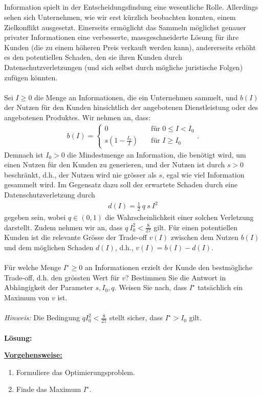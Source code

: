 \subsection*{}
Information spielt in der Entscheidungsfindung eine wesentliche Rolle. Allerdings
sehen sich Unternehmen, wie wir erst kürzlich beobachten konnten, einem Zielkonflikt
ausgesetzt. Einerseits ermöglicht das Sammeln möglichst genauer privater Informationen eine verbesserte, massgeschneiderte Lösung für ihre Kunden (die zu einem höheren Preis verkauft werden kann), andererseits erhöht es den potentiellen Schaden, den sie ihren Kunden durch Datenschutzverletzungen (und sich selbst durch mögliche juristische Folgen) zufügen könnten.\\
\\
Sei $I \geq 0 $ die Menge an Informationen, die ein Unternehmen sammelt, und $b(I)$ der Nutzen für den Kunden hinsichtlich der angebotenen Dienstleistung oder des angebotenen Produktes. Wir nehmen an, dass:
\begin{align*}
	b(I)
	= 
	\begin{cases}
		0 &\quad \textrm{für } 0 \leq I  < I_0\\
		s \left( 1 - \frac{I_0}{I} \right) & \quad \textrm{für } I \geq I_0
	\end{cases}.
\end{align*}
Demnach ist $I_0 > 0 $ die Mindestmenge an Information, die benötigt wird, um einen Nutzen für den Kunden zu generieren, und der Nutzen ist durch $s > 0 $ beschränkt, d.h., der Nutzen wird nie grösser als $s$, egal wie viel Information gesammelt wird. Im Gegensatz dazu soll der erwartete Schaden durch eine Datenschutzverletzung durch
\begin{align*}
	d(I) = \frac{1}{2} \ q \ s  \ I^2
\end{align*}
gegeben sein, wobei $q \in (0,1)$ die Wahrscheinlichkeit einer solchen Verletzung darstellt.
Zudem nehmen wir an, dass $q \  I_0^2 < \frac{8}{27}$ gilt. Für einen potentiellen Kunden ist die relevante Grösse der Trade-off $v(I)$ zwischen dem Nutzen $b(I)$ und dem möglichen Schaden $d(I)$, d.h., $v(I) = b(I) - d(I)$.\\
\\
Für welche Menge $I^\star \geq 0$ an Informationen erzielt der Kunde den bestmögliche Trade-off, d.h. den grössten Wert für $v$?
Bestimmen Sie die Antwort in Abhängigkeit der Parameter $s, I_0, q$.
Weisen Sie nach, dass $I^\star$ tatsächlich ein Maximum von $v$ ist.\\
\\
\textit{Hinweis:} Die Bedingung $q I_0^2 < \frac{8}{27}$ stellt sicher, dass $I^\star > I_0 $ gilt.\\
\\
\textbf{Lösung:}
\begin{mdframed}
\underline{\textbf{Vorgehensweise:}}
\begin{enumerate}
\item Formuliere das Optimierungsproblem.
\item Finde das Maximum $I^\star$.
\end{enumerate}
\end{mdframed}


